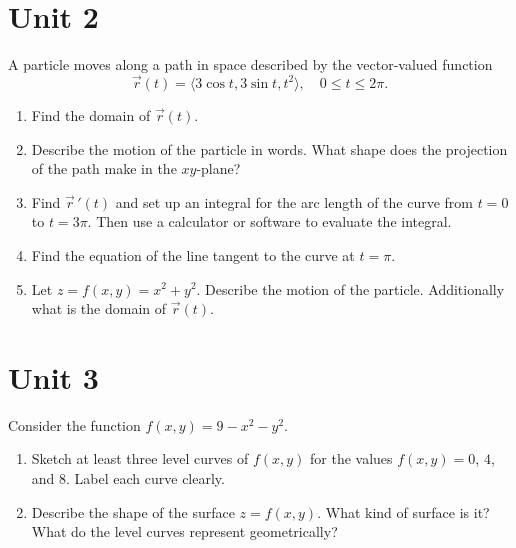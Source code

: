 \documentclass[11pt]{article}
\newenvironment{exercise}{
    \begin{mdframed}[style=problemstyle]\textcolor{black}{}
}{
    \end{mdframed}
}
\begin{document}
\section*{Unit 2}
\begin{exercise}
A particle moves along a path in space described by the vector-valued function
$$\vec{r}(t) = \langle 3\cos t, 3\sin t, t^2 \rangle, \quad 0 \le t \le 2\pi.$$
\begin{enumerate}[label={\alph*}]
    \item Find the domain of $\vec{r}(t)$.

    \item Describe the motion of the particle in words. What shape does the projection of the path make in the $xy$-plane?
    
    \item Find $\vec{r}\,'(t)$ and set up an integral for the arc length of the curve from $t = 0$ to $t = 3\pi$. Then use a calculator or software to evaluate the integral.
    
    \item Find the equation of the line tangent to the curve at $t = \pi$.

    \item Let $z = f(x, y) = x^2 + y^2$. Describe the motion of the particle. Additionally what is the domain of  $\vec{r}(t)$.

\end{enumerate}
\end{exercise}

\section*{Unit 3}
\begin{exercise}
Consider the function $f(x, y) = 9 - x^2 - y^2$.
\begin{enumerate}[label={\alph*}]
    \item Sketch at least three level curves of $f(x, y)$ for the values $f(x, y) = 0$, $4$, and $8$. Label each curve clearly.
    
    \item Describe the shape of the surface $z = f(x, y)$. What kind of surface is it? What do the level curves represent geometrically?
\end{enumerate}
\end{exercise}
\end{document}
